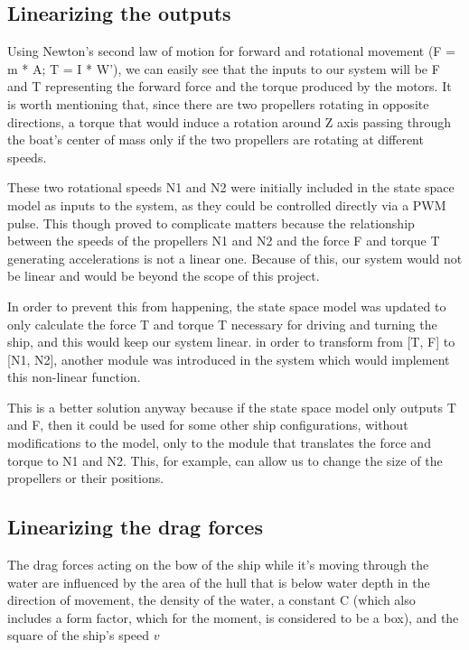 
\subsection{Linearizing the outputs}

Using Newton's second law of motion for forward  and rotational movement (F = m * A; T = I * W'), we can easily see that the inputs to our system will be F and T representing the forward force and the torque produced by the motors. It is worth mentioning that, since there are two propellers rotating in opposite directions, a torque that would induce a rotation around Z axis passing through the boat's center of mass only if the two propellers are rotating at different speeds.

These two rotational speeds N1 and N2 were initially included in the state space model as inputs to the system, as they could be controlled directly via a PWM pulse. This though proved to complicate matters because the relationship between the speeds of the propellers N1 and N2 and the force F and torque T generating accelerations is not a linear one. Because of this, our system would not be linear and would be beyond the scope of this project. 


In order to prevent this from happening, the state space model was updated to only calculate the force T and torque T necessary for driving and turning the ship, and this would keep our system linear. in order to transform from [T, F] to [N1, N2], another module was introduced in the system which would implement this non-linear function. 

This is a better solution anyway because if the state space model only outputs T and F, then it could be used for some other ship configurations, without modifications to the model, only to the module that translates the force and torque to N1 and N2. This, for example, can allow us to change the size of the propellers or their positions.

\subsection{Linearizing the drag forces}

The drag forces acting on the bow of the ship while it's moving through the water are influenced by the area of the hull that is below water depth in the direction of movement, the density of the water, a constant C (which also includes a form factor, which for the moment, is considered to be a box), and the square of the ship's speed $ v $

